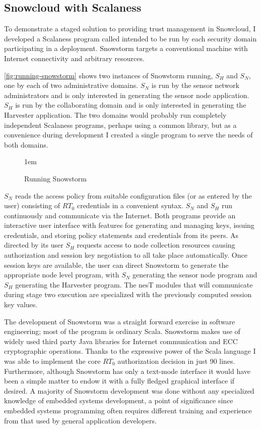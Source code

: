 \subsection{Snowcloud with Scalaness}

To demonstrate a staged solution to providing trust management in Snowcloud, I developed a
Scalaness program called  intended to be run by each security domain
participating in a deployment. Snowstorm targets a conventional machine with Internet
connectivity and arbitrary resources.

\autoref{fig:running-snowstorm} shows two instances of Snowstorm running, $S_H$ and $S_N$, one
by each of two administrative domains. $S_N$ is run by the sensor network administrators and is
only interested in generating the sensor node application. $S_H$ is run by the collaborating
domain and is only interested in generating the Harvester application. The two domains would
probably run completely independent Scalaness programs, perhaps using a common library, but as a
convenience during development I created a single program to serve the needs of both domains.

\begin{figure}[t]
  
  \centerline{\raise 1em\box\graph}
  \caption{Running Snowstorm}
  \label{fig:running-snowstorm}
\end{figure}

$S_N$ reads the access policy from suitable configuration files (or as entered by the user)
consisting of $RT_0$ credentials in a convenient syntax. $S_N$ and $S_H$ run continuously and
communicate via the Internet. Both programs provide an interactive user interface with features
for generating and managing keys, issuing credentials, and storing policy statements and
credentials from its peers. As directed by its user $S_H$ requests access to node collection
resources causing authorization and session key negotiation to all take place automatically.
Once session keys are available, the user can direct Snowstorm to generate the appropriate node
level program, with $S_N$ generating the sensor node program and $S_H$ generating the Harvester
program. The nesT modules that will communicate during stage two execution are specialized with
the previously computed session key values.

The development of Snowstorm was a straight forward exercise in software engineering; most of
the program is ordinary Scala. Snowstorm makes use of widely used third party Java libraries for
Internet communication and ECC cryptographic operations. Thanks to the expressive power of the
Scala language I was able to implement the core $RT_0$ authorization decision in just 90 lines.
Furthermore, although Snowstorm has only a text-mode interface it would have been a simple
matter to endow it with a fully fledged graphical interface if desired. A majority of Snowstorm
development was done without any specialized knowledge of embedded systems development, a point
of significance since embedded systems programming often requires different training and
experience from that used by general application developers.

